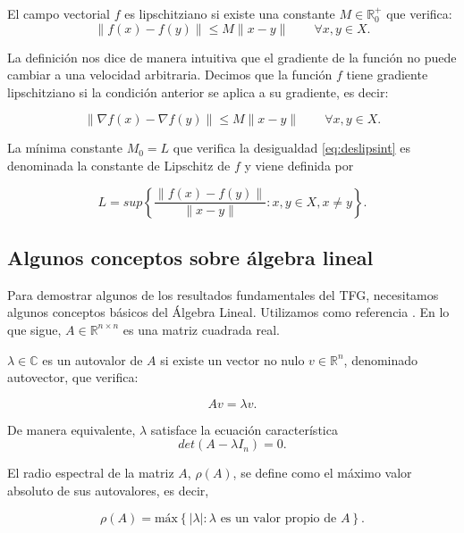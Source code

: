 \begin{definicion}
    El campo vectorial $f$ es lipschitziano si existe una constante $M \in \mathbb{R}_0^+$ que verifica:
	\begin{equation}\label{eq:deslipsint}
	\| f(x) - f(y) \| \leq M \| x - y \| \qquad \forall x,y \in X.
	\end{equation}
\end{definicion}

La definición nos dice de manera intuitiva que el gradiente de la función no puede cambiar a una velocidad arbitraria. Decimos que la función $f$ tiene gradiente lipschitziano si la condición anterior se aplica a su gradiente, es decir:

\begin{equation}
\| \nabla f(x) - \nabla f(y) \| \leq M \| x - y \| \qquad \forall x,y \in X.
\end{equation}


La mínima constante $M_0=L$ que verifica la desigualdad \eqref{eq:deslipsint} es denominada la constante de Lipschitz de $f$ y viene definida por 

$$L=sup \left \{ \frac{\|f(x)-f(y)\|}{\|x - y \|} : x,y \in X, x \neq y \right \}.$$


\subsection{Algunos conceptos sobre álgebra lineal}


Para demostrar algunos de los resultados fundamentales del TFG, necesitamos algunos conceptos básicos del Álgebra Lineal. Utilizamos como referencia \cite{axler2024linear}. En lo que sigue, $A \in \mathbb{R}^{n \times n}$ es una matriz cuadrada real.

\begin{definicion}
	$\lambda \in \mathbb{C}$ es un autovalor de $A$ si existe un vector no nulo $v \in \mathbb{R}^n$, denominado autovector, que verifica:

	\begin{equation*} 
		Av = \lambda v.
	\end{equation*}

De manera equivalente, $\lambda$ satisface la ecuación característica \[det(A-\lambda I_n)=0.\]
\end{definicion}

\begin{definicion}
	El radio espectral de la matriz $A$, $\rho(A)$, se define como el máximo valor absoluto de sus autovalores, es decir, 

	\begin{equation*} 
		\rho(A) = \text{máx} \left \{ | \lambda | : \lambda \text{ es un valor propio de } A \right \}.
	\end{equation*}
\end{definicion}

